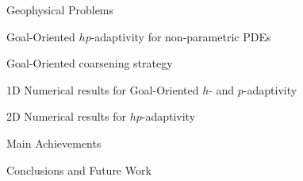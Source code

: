 
  



\begin{section}{Geophysical Problems} 
%
%
%
%
\end{section}

\begin{section}{Goal-Oriented $hp$-adaptivity for non-parametric PDEs}

%
%
%
% 
%
%
%
%
\end{section}
\begin{section}{Goal-Oriented coarsening strategy}

%
\end{section}
\begin{section}{1D Numerical results for Goal-Oriented $h$- and $p$-adaptivity}

%
\end{section}
\begin{section}{2D Numerical results for $hp$-adaptivity}



\end{section}
\begin{section}{Main Achievements}



\end{section}
\begin{section}{Conclusions and Future Work}



\end{section}

